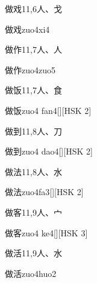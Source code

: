 \begin{entry}{做戏}{11,6}{⼈、⼽}
  \begin{phonetics}{做戏}{zuo4xi4}
  \end{phonetics}
\end{entry}

\begin{entry}{做作}{11,7}{⼈、⼈}
  \begin{phonetics}{做作}{zuo4zuo5}
  \end{phonetics}
\end{entry}

\begin{entry}{做饭}{11,7}{⼈、⾷}
  \begin{phonetics}{做饭}{zuo4 fan4}[][HSK 2]
  \end{phonetics}
\end{entry}

\begin{entry}{做到}{11,8}{⼈、⼑}
  \begin{phonetics}{做到}{zuo4 dao4}[][HSK 2]
  \end{phonetics}
\end{entry}

\begin{entry}{做法}{11,8}{⼈、⽔}
  \begin{phonetics}{做法}{zuo4fa3}[][HSK 2]
  \end{phonetics}
\end{entry}

\begin{entry}{做客}{11,9}{⼈、⼧}
  \begin{phonetics}{做客}{zuo4 ke4}[][HSK 3]
  \end{phonetics}
\end{entry}

\begin{entry}{做活}{11,9}{⼈、⽔}
  \begin{phonetics}{做活}{zuo4huo2}
  \end{phonetics}
\end{entry}

